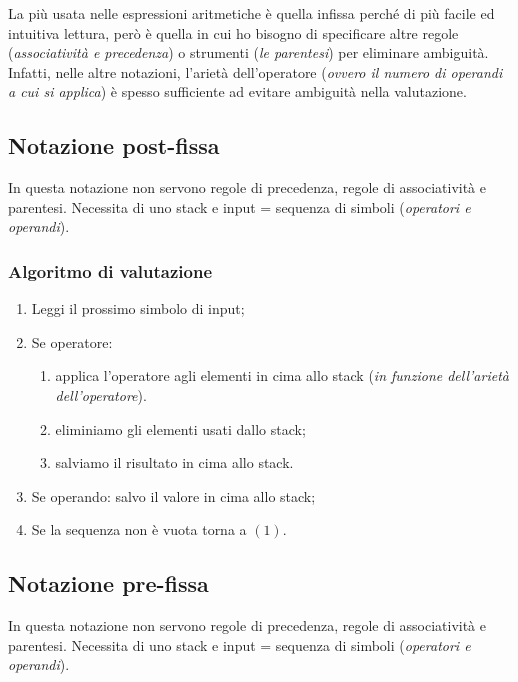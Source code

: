 \documentclass[oneside,a4paper,11pt]{book}
\theoremstyle{italicstyle}
\theoremstyle{normStyle}
\begin{document}
La più usata nelle espressioni aritmetiche è quella infissa perché di più
facile ed intuitiva lettura, però è quella in cui ho bisogno di
specificare altre regole (\textit{associatività e precedenza}) o strumenti
(\textit{le parentesi}) per eliminare ambiguità. Infatti, nelle 
altre notazioni, l’arietà dell’operatore (\textit{ovvero il numero di operandi
a cui si applica}) è spesso sufficiente ad evitare ambiguità nella
valutazione.
\subsection{Notazione post-fissa}
In questa notazione non servono regole di precedenza, regole di associatività e 
parentesi.
Necessita di uno stack e input = sequenza di simboli (\textit{operatori e operandi}).
\subsubsection{Algoritmo di valutazione}
\begin{enumerate}
  \item Leggi il prossimo simbolo di input;
  \item Se operatore:
  \begin{enumerate}
    \item applica l'operatore agli elementi in cima allo stack (\textit{in 
    funzione dell'arietà dell'operatore}).
    \item eliminiamo gli elementi usati dallo stack;
    \item salviamo il risultato in cima allo stack.
  \end{enumerate}
  \item Se operando: salvo il valore in cima allo stack;
  \item Se la sequenza non è vuota torna a $(1)$.
\end{enumerate}
\subsection{Notazione pre-fissa}
In questa notazione non servono regole di precedenza, regole di associatività e 
parentesi.
Necessita di uno stack e input = sequenza di simboli (\textit{operatori e operandi}).
\end{document}
